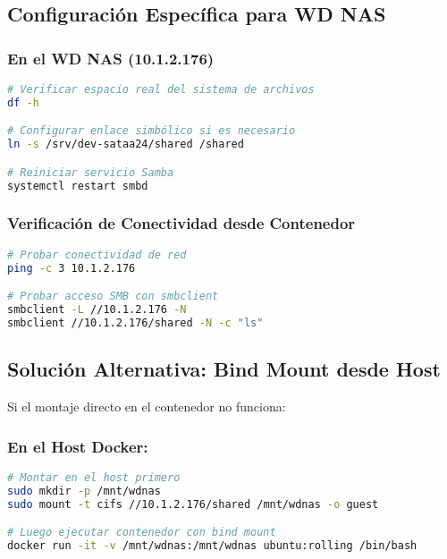 \documentclass[12pt, a4paper]{article}
\begin{document}
\subsection{Configuración Específica para WD NAS}
\label{subsec:configuracion_nas}

\subsubsection{En el WD NAS (10.1.2.176)}
\begin{lstlisting}[language=bash, caption=Configuración en el NAS]
# Verificar espacio real del sistema de archivos
df -h

# Configurar enlace simbólico si es necesario
ln -s /srv/dev-sataa24/shared /shared

# Reiniciar servicio Samba
systemctl restart smbd
\end{lstlisting}

\subsubsection{Verificación de Conectividad desde Contenedor}
\begin{lstlisting}[language=bash, caption=Pruebas de conectividad]
# Probar conectividad de red
ping -c 3 10.1.2.176

# Probar acceso SMB con smbclient
smbclient -L //10.1.2.176 -N
smbclient //10.1.2.176/shared -N -c "ls"
\end{lstlisting}

\subsection{Solución Alternativa: Bind Mount desde Host}
\label{subsec:bind_mount}

Si el montaje directo en el contenedor no funciona:

\subsubsection{En el Host Docker:}
\begin{lstlisting}[language=bash, caption=Montaje desde el host]
# Montar en el host primero
sudo mkdir -p /mnt/wdnas
sudo mount -t cifs //10.1.2.176/shared /mnt/wdnas -o guest

# Luego ejecutar contenedor con bind mount
docker run -it -v /mnt/wdnas:/mnt/wdnas ubuntu:rolling /bin/bash
\end{lstlisting}
\end{document}
